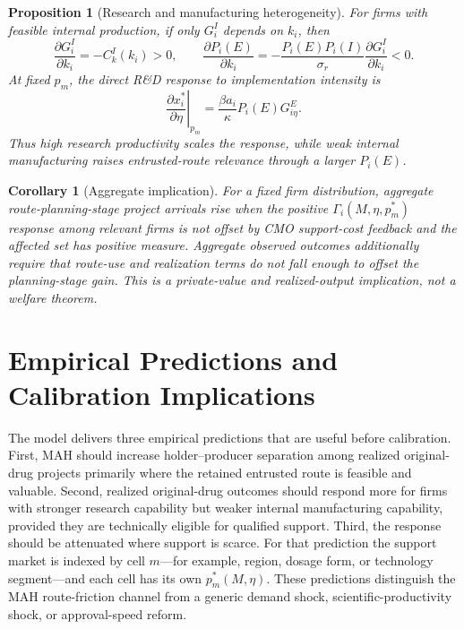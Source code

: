 \documentclass[12pt]{article}
\newtheorem{proposition}{Proposition}
\newtheorem{corollary}{Corollary}
\newcommand{\1}{\mathbf{1}}
\begin{document}
\begin{proposition}[Research and manufacturing heterogeneity]
\label{prop:heterogeneity}
For firms with feasible internal production, if only $G_i^I$ depends on $k_i$, then
\begin{equation}
    \frac{\partial G_i^I}{\partial k_i}=-C_k^I(k_i)>0,
    \qquad
    \frac{\partial P_i(E)}{\partial k_i}
    =-\frac{P_i(E)P_i(I)}{\sigma_r}
      \frac{\partial G_i^I}{\partial k_i}<0.
    \label{eq:dPEdk}
\end{equation}
At fixed $p_m$, the direct R\&D response to implementation intensity is
\begin{equation}
    \left.\frac{\partial x_i^*}{\partial\eta}\right|_{p_m}
    =\frac{\beta a_i}{\kappa}P_i(E)G_{i\eta}^E.
    \label{eq:direct_x_eta}
\end{equation}
Thus high research productivity scales the response, while weak internal manufacturing raises entrusted-route relevance through a larger $P_i(E)$.
\end{proposition}

\begin{corollary}[Aggregate implication]
For a fixed firm distribution, aggregate route-planning-stage project arrivals rise when the positive $\Gamma_i(M,\eta,p_m^*)$ response among relevant firms is not offset by CMO support-cost feedback and the affected set has positive measure. Aggregate observed outcomes additionally require that route-use and realization terms do not fall enough to offset the planning-stage gain. This is a private-value and realized-output implication, not a welfare theorem.
\end{corollary}

\section{Empirical Predictions and Calibration Implications}

The model delivers three empirical predictions that are useful before calibration. First, MAH should increase holder--producer separation among realized original-drug projects primarily where the retained entrusted route is feasible and valuable. Second, realized original-drug outcomes should respond more for firms with stronger research capability but weaker internal manufacturing capability, provided they are technically eligible for qualified support. Third, the response should be attenuated where support is scarce. For that prediction the support market is indexed by cell $m$---for example, region, dosage form, or technology segment---and each cell has its own $p_m^*(M,\eta)$. These predictions distinguish the MAH route-friction channel from a generic demand shock, scientific-productivity shock, or approval-speed reform.
\end{document}
